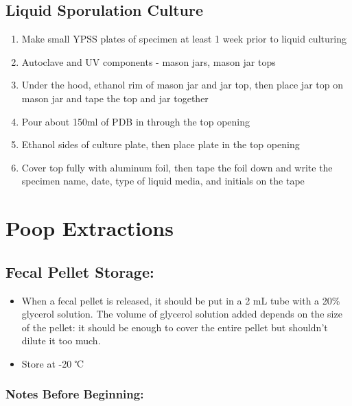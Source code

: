 \documentclass[
]{book}
\providecommand{\tightlist}{%
  \setlength{\itemsep}{0pt}\setlength{\parskip}{0pt}}
\begin{document}
\hypertarget{liquid-sporulation-culture}{%
\section{Liquid Sporulation Culture}\label{liquid-sporulation-culture}}

\begin{enumerate}
\def\labelenumi{\arabic{enumi}.}
\tightlist
\item
  Make small YPSS plates of specimen at least 1 week prior to liquid culturing
\item
  Autoclave and UV components - mason jars, mason jar tops
\item
  Under the hood, ethanol rim of mason jar and jar top, then place jar top on mason jar and tape the top and jar together
\item
  Pour about 150ml of PDB in through the top opening
\item
  Ethanol sides of culture plate, then place plate in the top opening
\item
  Cover top fully with aluminum foil, then tape the foil down and write the specimen name, date, type of liquid media, and initials on the tape
\end{enumerate}

\hypertarget{poop-extractions}{%
\chapter{Poop Extractions}\label{poop-extractions}}

\hypertarget{fecal-pellet-storage}{%
\section{Fecal Pellet Storage:}\label{fecal-pellet-storage}}

\begin{itemize}
\item
  When a fecal pellet is released, it should be put in a 2 mL tube with a 20\% glycerol solution. The volume of glycerol solution added depends on the size of the pellet: it should be enough to cover the entire pellet but shouldn't dilute it too much.
\item
  Store at -20 ℃
\end{itemize}

\hypertarget{notes-before-beginning}{%
\subsection{Notes Before Beginning:}\label{notes-before-beginning}}
\end{document}
